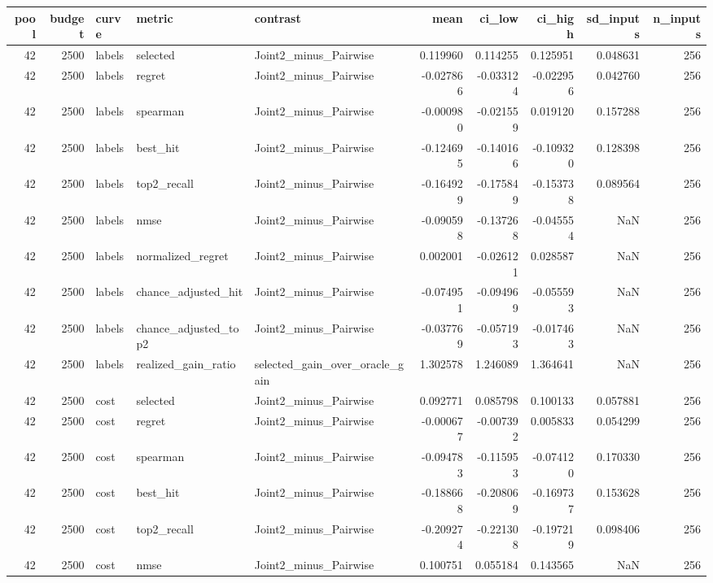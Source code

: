 \begin{tabular}{rrlllrrrrr}
\toprule
pool & budget & curve & metric & contrast & mean & ci_low & ci_high & sd_inputs & n_inputs \\
\midrule
42 & 2500 & labels & selected & Joint2_minus_Pairwise & 0.119960 & 0.114255 & 0.125951 & 0.048631 & 256 \\
42 & 2500 & labels & regret & Joint2_minus_Pairwise & -0.027866 & -0.033124 & -0.022956 & 0.042760 & 256 \\
42 & 2500 & labels & spearman & Joint2_minus_Pairwise & -0.000980 & -0.021559 & 0.019120 & 0.157288 & 256 \\
42 & 2500 & labels & best_hit & Joint2_minus_Pairwise & -0.124695 & -0.140166 & -0.109320 & 0.128398 & 256 \\
42 & 2500 & labels & top2_recall & Joint2_minus_Pairwise & -0.164929 & -0.175849 & -0.153738 & 0.089564 & 256 \\
42 & 2500 & labels & nmse & Joint2_minus_Pairwise & -0.090598 & -0.137268 & -0.045554 & NaN & 256 \\
42 & 2500 & labels & normalized_regret & Joint2_minus_Pairwise & 0.002001 & -0.026121 & 0.028587 & NaN & 256 \\
42 & 2500 & labels & chance_adjusted_hit & Joint2_minus_Pairwise & -0.074951 & -0.094969 & -0.055593 & NaN & 256 \\
42 & 2500 & labels & chance_adjusted_top2 & Joint2_minus_Pairwise & -0.037769 & -0.057193 & -0.017463 & NaN & 256 \\
42 & 2500 & labels & realized_gain_ratio & selected_gain_over_oracle_gain & 1.302578 & 1.246089 & 1.364641 & NaN & 256 \\
42 & 2500 & cost & selected & Joint2_minus_Pairwise & 0.092771 & 0.085798 & 0.100133 & 0.057881 & 256 \\
42 & 2500 & cost & regret & Joint2_minus_Pairwise & -0.000677 & -0.007392 & 0.005833 & 0.054299 & 256 \\
42 & 2500 & cost & spearman & Joint2_minus_Pairwise & -0.094783 & -0.115953 & -0.074120 & 0.170330 & 256 \\
42 & 2500 & cost & best_hit & Joint2_minus_Pairwise & -0.188668 & -0.208069 & -0.169737 & 0.153628 & 256 \\
42 & 2500 & cost & top2_recall & Joint2_minus_Pairwise & -0.209274 & -0.221308 & -0.197219 & 0.098406 & 256 \\
42 & 2500 & cost & nmse & Joint2_minus_Pairwise & 0.100751 & 0.055184 & 0.143565 & NaN & 256 \\

\end{tabular}

